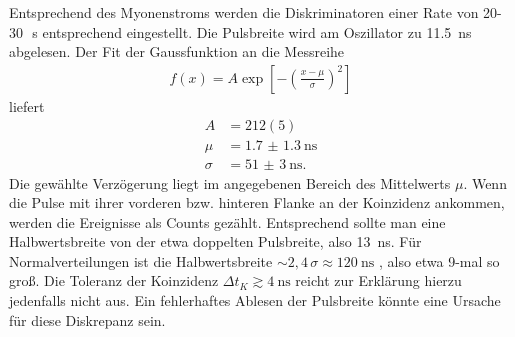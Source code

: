 Entsprechend des Myonenstroms \cite{pdg} werden die Diskriminatoren einer Rate von 20-30\,\si{\per\second} \cite{Anl} entsprechend eingestellt. Die 
Pulsbreite wird am Oszillator zu \SI{11,5}{\nano\second} abgelesen. Der Fit der Gaussfunktion an die Messreihe 
\begin{align}
 f(x) = A\exp\left[-\left(\frac{x-\mu}{\sigma}\right)^2\right]
\end{align}
liefert
\begin{align}
 A &= 212(5)\\
 \mu &=  \SI{1.7(13)}{\nano\second}\\
 \sigma &= \SI{51(3)}{\nano\second}.
\end{align}
Die gewählte Verzögerung liegt im angegebenen Bereich des Mittelwerts $\mu$. Wenn die Pulse mit ihrer vorderen bzw. hinteren Flanke an der 
Koinzidenz ankommen, werden die Ereignisse als Counts gezählt. Entsprechend sollte man eine Halbwertsbreite von der etwa doppelten Pulsbreite,
also \SI{13}{\nano\second}. Für Normalverteilungen ist die Halbwertsbreite $\sim 2,4\,\sigma \approx \SI{120}{\nano\second}$ \cite{standard}, also etwa 9-mal
so groß. Die Toleranz der Koinzidenz $\Delta t_K \gtrsim \SI{4}{\nano\second}$ reicht zur Erklärung hierzu jedenfalls nicht aus. 
Ein fehlerhaftes Ablesen der Pulsbreite könnte eine Ursache für diese Diskrepanz sein. 


